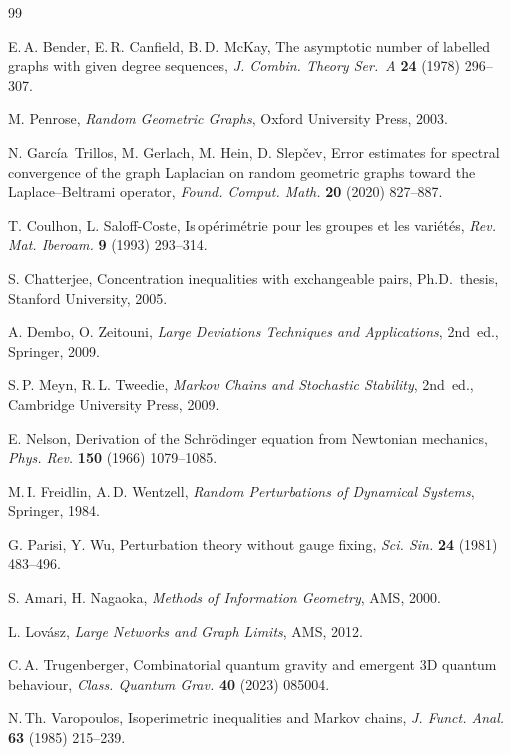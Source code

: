\documentclass[11pt, a4paper]{article}
\begin{document}
\begin{thebibliography}{99}

E.\,A. Bender, E.\,R. Canfield, B.\,D. McKay,
The asymptotic number of labelled graphs with given degree sequences,
\textit{J. Combin. Theory Ser.~A} \textbf{24} (1978) 296--307.

M. Penrose, \textit{Random Geometric Graphs},
Oxford University Press, 2003.

N. Garc\'ia~Trillos, M. Gerlach, M. Hein, D. Slep\v{c}ev,
Error estimates for spectral convergence of the graph Laplacian
on random geometric graphs toward the Laplace--Beltrami operator,
\textit{Found. Comput. Math.} \textbf{20} (2020) 827--887.

T. Coulhon, L. Saloff-Coste,
Is\,op\'erim\'etrie pour les groupes et les vari\'et\'es,
\textit{Rev. Mat. Iberoam.} \textbf{9} (1993) 293--314.

S. Chatterjee,
Concentration inequalities with exchangeable pairs,
Ph.D.\ thesis, Stanford University, 2005.

A. Dembo, O. Zeitouni,
\textit{Large Deviations Techniques and Applications},
2nd~ed., Springer, 2009.

S.\,P. Meyn, R.\,L. Tweedie,
\textit{Markov Chains and Stochastic Stability},
2nd~ed., Cambridge University Press, 2009.

E. Nelson,
Derivation of the Schr\"odinger equation from Newtonian mechanics,
\textit{Phys. Rev.} \textbf{150} (1966) 1079--1085.

M.\,I. Freidlin, A.\,D. Wentzell,
\textit{Random Perturbations of Dynamical Systems},
Springer, 1984.

G. Parisi, Y. Wu,
Perturbation theory without gauge fixing,
\textit{Sci. Sin.} \textbf{24} (1981) 483--496.

S. Amari, H. Nagaoka,
\textit{Methods of Information Geometry},
AMS, 2000.

L. Lov\'asz,
\textit{Large Networks and Graph Limits},
AMS, 2012.

C.\,A. Trugenberger,
Combinatorial quantum gravity and emergent 3D quantum behaviour,
\textit{Class. Quantum Grav.} \textbf{40} (2023) 085004.

N.\,Th. Varopoulos,
Isoperimetric inequalities and Markov chains,
\textit{J. Funct. Anal.} \textbf{63} (1985) 215--239.

\end{thebibliography}
\end{document}
